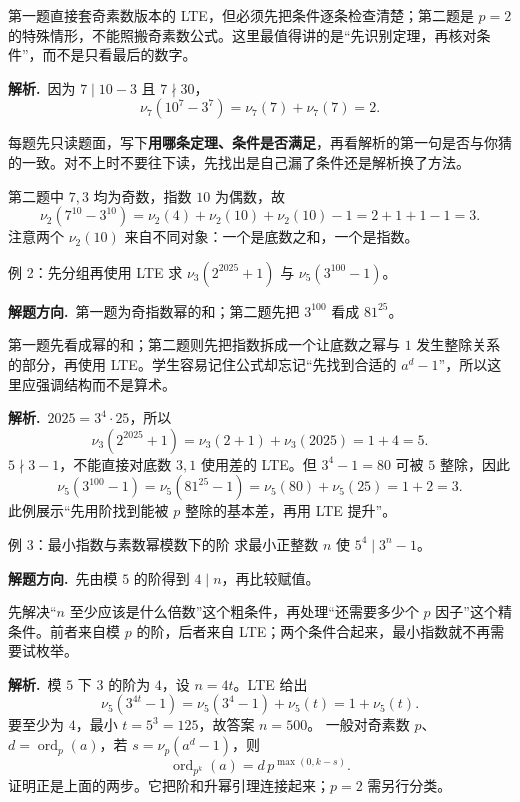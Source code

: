 \documentclass[UTF8,a4paper,11pt,twoside,openright,fontset=fandol]{ctexbook}
\theoremstyle{definition}
\newcommand{\ord}{\operatorname{ord}}
\newcommand{\sol}{\par\noindent\textbf{解析.}\ }
\newcommand{\hint}{\par\noindent\textbf{解题方向.}\ }
\begin{document}
\begin{pitfall}[讲解：先看这题到底在做什么]
第一题直接套奇素数版本的 LTE，但必须先把条件逐条检查清楚；第二题是 $p=2$ 的特殊情形，不能照搬奇素数公式。这里最值得讲的是“先识别定理，再核对条件”，而不是只看最后的数字。
\end{pitfall}

\sol 因为 $7\mid10-3$ 且 $7\nmid30$，
\[
 \nu_7(10^7-3^7)=\nu_7(7)+\nu_7(7)=2.
\]

\begin{tip}[怎么用一节里的例题]
每题先只读题面，写下\textbf{用哪条定理、条件是否满足}，再看解析的第一句是否与你猜的一致。对不上时不要往下读，先找出是自己漏了条件还是解析换了方法。
\end{tip}

第二题中 $7,3$ 均为奇数，指数 $10$ 为偶数，故
\[
 \nu_2(7^{10}-3^{10})=\nu_2(4)+\nu_2(10)+\nu_2(10)-1=2+1+1-1=3.
\]
注意两个 $\nu_2(10)$ 来自不同对象：一个是底数之和，一个是指数。


\begin{problem}{例 2：先分组再使用 LTE}
求 $\nu_3(2^{2025}+1)$ 与 $\nu_5(3^{100}-1)$。
\end{problem}
\hint 第一题为奇指数幂的和；第二题先把 $3^{100}$ 看成 $81^{25}$。

\begin{pitfall}[讲解：先看这题到底在做什么]
第一题先看成幂的和；第二题则先把指数拆成一个让底数之幂与 $1$ 发生整除关系的部分，再使用 LTE。学生容易记住公式却忘记“先找到合适的 $a^d-1$”，所以这里应强调结构而不是算术。
\end{pitfall}

\sol $2025=3^4\cdot25$，所以
\[
\nu_3(2^{2025}+1)=\nu_3(2+1)+\nu_3(2025)=1+4=5.
\]
$5\nmid3-1$，不能直接对底数 $3,1$ 使用差的 LTE。但 $3^4-1=80$ 可被 $5$ 整除，因此
\[
\nu_5(3^{100}-1)=\nu_5(81^{25}-1)=\nu_5(80)+\nu_5(25)=1+2=3.
\]
此例展示“先用阶找到能被 $p$ 整除的基本差，再用 LTE 提升”。


\begin{problem}{例 3：最小指数与素数幂模数下的阶}
求最小正整数 $n$ 使 $5^4\mid3^n-1$。
\end{problem}
\hint 先由模 $5$ 的阶得到 $4\mid n$，再比较赋值。

\begin{pitfall}[讲解：先看这题到底在做什么]
先解决“$n$ 至少应该是什么倍数”这个粗条件，再处理“还需要多少个 $p$ 因子”这个精条件。前者来自模 $p$ 的阶，后者来自 LTE；两个条件合起来，最小指数就不再需要试枚举。
\end{pitfall}

\sol 模 $5$ 下 $3$ 的阶为 $4$，设 $n=4t$。LTE 给出
\[
 \nu_5(3^{4t}-1)=\nu_5(3^4-1)+\nu_5(t)=1+\nu_5(t).
\]
要至少为 $4$，最小 $t=5^3=125$，故答案 $n=500$。
一般对奇素数 $p$、$d=\ord_p(a)$，若 $s=\nu_p(a^d-1)$，则
\[
 \ord_{p^k}(a)=d\,p^{\max(0,k-s)}.
\]
证明正是上面的两步。它把阶和升幂引理连接起来；$p=2$ 需另行分类。
\end{document}
